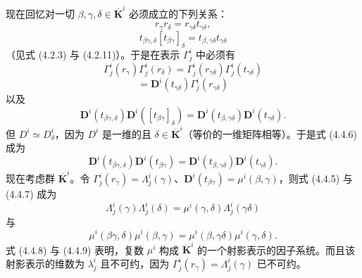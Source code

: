 现在回忆对一切 $\beta, \gamma, \delta \in \overline{\mathbf{K}}^{i}$ 必须成立的下列关系：
\begin{equation*}
r_{\gamma}r_{\delta} = r_{\gamma\delta}t_{\gamma\delta},
\tag{4.4.2}
\end{equation*}
\begin{equation*}
t_{\beta\gamma, \delta}[t_{\beta\gamma}]_{\delta} = t_{\beta, \gamma\delta}t_{\gamma\delta}
\tag{4.4.3}
\end{equation*}
（见式 (4.2.3) 与 (4.2.11)）。于是在表示 $\Gamma^{i}_{j}$ 中必须有
\begin{equation*}
\Gamma^{i}_{j}(r_{\gamma})\Gamma^{i}_{j}(r_{\delta}) = \Gamma^{i}_{j}(r_{\gamma\delta})\Gamma^{i}_{j}(t_{\gamma\delta})
\tag{4.4.4}
\end{equation*}
\begin{equation*}
= \mathbf{D}^{i}(t_{\gamma\delta})\Gamma^{i}_{j}(r_{\gamma\delta})
\tag{4.4.5}
\end{equation*}
以及
\begin{equation*}
\mathbf{D}^{i}(t_{\beta\gamma, \delta})\mathbf{D}^{i}([t_{\beta\gamma}]_{\delta}) = \mathbf{D}^{i}(t_{\beta, \gamma\delta})\mathbf{D}^{i}(t_{\gamma\delta}).
\tag{4.4.6}
\end{equation*}
但 $D^{i} \simeq D^{i}_{\delta}$，因为 $D^{i}$ 是一维的且 $\delta \in \overline{\mathbf{K}}^{i}$（等价的一维矩阵相等）。于是式 (4.4.6) 成为
\begin{equation*}
\mathbf{D}^{i}(t_{\beta\gamma, \delta})\mathbf{D}^{i}(t_{\beta\gamma}) = \mathbf{D}^{i}(t_{\beta, \gamma\delta})\mathbf{D}^{i}(t_{\gamma\delta}).
\tag{4.4.7}
\end{equation*}
现在考虑群 $\overline{\mathbf{K}}^{i}$。令 $\Gamma^{i}_{j}(r_{\gamma}) = \Lambda^{i}_{j}(\gamma)$、$\mathbf{D}^{i}(t_{\beta\gamma}) = \mu^{i}(\beta, \gamma)$，则式 (4.4.5) 与 (4.4.7) 成为
\begin{equation*}
\Lambda^{i}_{j}(\gamma)\Lambda^{i}_{j}(\delta) = \mu^{i}(\gamma, \delta)\Lambda^{i}_{j}(\gamma\delta)
\tag{4.4.8}
\end{equation*}
与
\begin{equation*}
\mu^{i}(\beta\gamma, \delta)\mu^{i}(\beta, \gamma) = \mu^{i}(\beta, \gamma\delta)\mu^{i}(\gamma, \delta).
\tag{4.4.9}
\end{equation*}
式 (4.4.8) 与 (4.4.9) 表明，复数 $\mu^{i}$ 构成 $\overline{\mathbf{K}}^{i}$ 的一个射影表示的因子系统。而且该射影表示的维数为 $\lambda^{i}_{j}$ 且不可约，因为 $\Gamma^{i}_{j}(r_{\gamma}) = \Lambda^{i}_{j}(\gamma)$ 已不可约。

